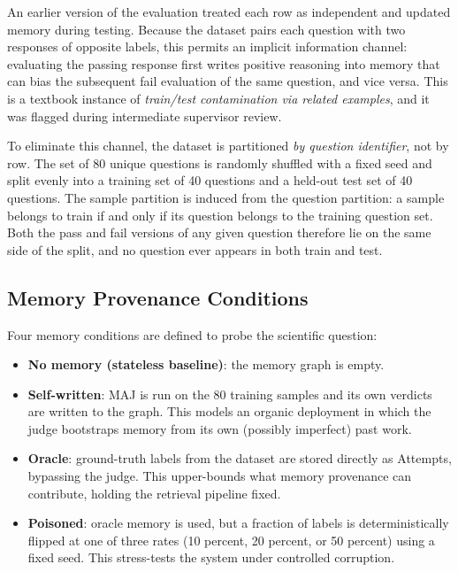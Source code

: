 \documentclass[12pt,a4paper]{report}
\begin{document}
An earlier version of the evaluation treated each row as independent and updated memory during testing. Because the dataset pairs each question with two responses of opposite labels, this permits an implicit information channel: evaluating the passing response first writes positive reasoning into memory that can bias the subsequent fail evaluation of the same question, and vice versa. This is a textbook instance of \textit{train/test contamination via related examples}, and it was flagged during intermediate supervisor review.

To eliminate this channel, the dataset is partitioned \textit{by question identifier}, not by row. The set of 80 unique questions is randomly shuffled with a fixed seed and split evenly into a training set of 40 questions and a held-out test set of 40 questions. The sample partition is induced from the question partition: a sample belongs to train if and only if its question belongs to the training question set. Both the pass and fail versions of any given question therefore lie on the same side of the split, and no question ever appears in both train and test.

\subsection{Memory Provenance Conditions}

Four memory conditions are defined to probe the scientific question:

\begin{itemize}
    \item \textbf{No memory (stateless baseline)}: the memory graph is empty.
    \item \textbf{Self-written}: MAJ is run on the 80 training samples and its own verdicts are written to the graph. This models an organic deployment in which the judge bootstraps memory from its own (possibly imperfect) past work.
    \item \textbf{Oracle}: ground-truth labels from the dataset are stored directly as Attempts, bypassing the judge. This upper-bounds what memory provenance can contribute, holding the retrieval pipeline fixed.
    \item \textbf{Poisoned}: oracle memory is used, but a fraction of labels is deterministically flipped at one of three rates (10 percent, 20 percent, or 50 percent) using a fixed seed. This stress-tests the system under controlled corruption.
\end{itemize}
\end{document}
